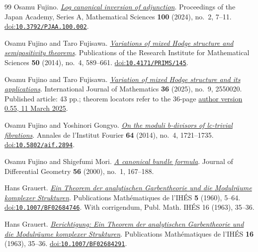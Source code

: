 \begin{thebibliography}{99}
Osamu Fujino.
\emph{\href{https://www.math.kyoto-u.ac.jp/~fujino/on-inversion-of-adjunction-pja-final.pdf}{Log canonical inversion of adjunction}}.
Proceedings of the Japan Academy, Series A, Mathematical Sciences \textbf{100} (2024), no.~2, 7--11.
\href{https://doi.org/10.3792/PJAA.100.002}{doi:\nolinkurl{10.3792/PJAA.100.002}}.

Osamu Fujino and Taro Fujisawa.
\emph{\href{https://ems.press/content/serial-article-files/41240}{Variations of mixed {Hodge} structure and semipositivity theorems}}.
Publications of the Research Institute for Mathematical Sciences \textbf{50} (2014), no.~4, 589--661.
\href{https://doi.org/10.4171/PRIMS/145}{doi:\nolinkurl{10.4171/PRIMS/145}}.

Osamu Fujino and Taro Fujisawa.
\emph{\href{https://www.math.kyoto-u.ac.jp/~fujino/vmhs-applications8.pdf}{Variation of mixed {Hodge} structure and its applications}}.
International Journal of Mathematics \textbf{36} (2025), no.~9, 2550020.
Published article: 43 pp.; theorem locators refer to the 36-page \href{https://www.math.kyoto-u.ac.jp/~fujino/vmhs-applications8.pdf}{author version 0.55, 11 March 2025}.

Osamu Fujino and Yoshinori Gongyo.
\emph{\href{https://www.numdam.org/item/10.5802/aif.2894.pdf}{On the moduli b-divisors of lc-trivial fibrations}}.
Annales de l'Institut Fourier \textbf{64} (2014), no.~4, 1721--1735.
\href{https://doi.org/10.5802/aif.2894}{doi:\nolinkurl{10.5802/aif.2894}}.

Osamu Fujino and Shigefumi Mori.
\emph{\href{https://www.math.kyoto-u.ac.jp/~fujino/Canonical.pdf}{A canonical bundle formula}}.
Journal of Differential Geometry \textbf{56} (2000), no.~1, 167--188.

Hans Grauert.
\emph{\href{https://www.numdam.org/item/PMIHES_1960__5__5_0/}{Ein Theorem der analytischen Garbentheorie und die Modulr{\"a}ume komplexer Strukturen}}.
Publications Math{\'e}matiques de l'IH{\'E}S \textbf{5} (1960), 5--64.
\href{https://doi.org/10.1007/BF02684746}{doi:\nolinkurl{10.1007/BF02684746}}.
With corrigendum, Publ. Math. IH{\'E}S 16 (1963), 35--36.

Hans Grauert.
\emph{\href{https://www.numdam.org/articles/10.1007/BF02684291/}{Berichtigung: Ein Theorem der analytischen Garbentheorie und die Modulr{\"a}ume komplexer Strukturen}}.
Publications Math{\'e}matiques de l'IH{\'E}S \textbf{16} (1963), 35--36.
\href{https://doi.org/10.1007/BF02684291}{doi:\nolinkurl{10.1007/BF02684291}}.


\end{thebibliography}
